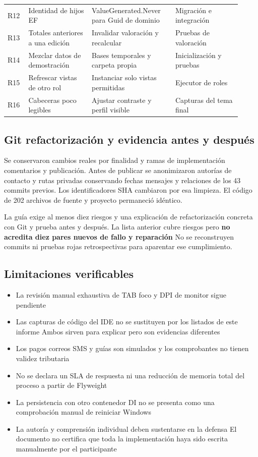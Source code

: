 \begin{longtable}{@{}>{\raggedright\arraybackslash}p{0.08\linewidth}>{\raggedright\arraybackslash}p{0.25\linewidth}>{\raggedright\arraybackslash}p{0.33\linewidth}>{\raggedright\arraybackslash}p{0.26\linewidth}@{}}
R12 & Identidad de hijos EF & ValueGenerated.Never para Guid de dominio & Migración e integración\\[3pt]
R13 & Totales anteriores a una edición & Invalidar valoración y recalcular & Pruebas de valoración\\[3pt]
R14 & Mezclar datos de demostración & Bases temporales y carpeta propia & Inicialización y pruebas\\[3pt]
R15 & Refrescar vistas de otro rol & Instanciar solo vistas permitidas & Ejecutor de roles\\[3pt]
R16 & Cabeceras poco legibles & Ajustar contraste y perfil visible & Capturas del tema final\\[3pt]
\bottomrule
\end{longtable}
\endgroup

\subsection{Git refactorización y evidencia antes y después}
Se conservaron cambios reales por finalidad y ramas de implementación comentarios y publicación. Antes de publicar se anonimizaron autorías de contacto y rutas privadas conservando fechas mensajes y relaciones de los 43 commits previos. Los identificadores SHA cambiaron por esa limpieza. El código de 202 archivos de fuente y proyecto permaneció idéntico.

La guía exige al menos diez riesgos y una explicación de refactorización concreta con Git y prueba antes y después. La lista anterior cubre riesgos pero \textbf{no acredita diez pares nuevos de fallo y reparación} No se reconstruyen commits ni pruebas rojas retrospectivas para aparentar ese cumplimiento.

\subsection{Limitaciones verificables}
\begin{itemize}[leftmargin=1.2cm]
\item La revisión manual exhaustiva de TAB foco y DPI de monitor sigue pendiente
\item Las capturas de código del IDE no se sustituyen por los listados de este informe Ambos sirven para explicar pero son evidencias diferentes
\item Los pagos correos SMS y guías son simulados y los comprobantes no tienen validez tributaria
\item No se declara un SLA de respuesta ni una reducción de memoria total del proceso a partir de Flyweight
\item La persistencia con otro contenedor DI no se presenta como una comprobación manual de reiniciar Windows
\item La autoría y comprensión individual deben sustentarse en la defensa El documento no certifica que toda la implementación haya sido escrita manualmente por el participante
\end{itemize}
